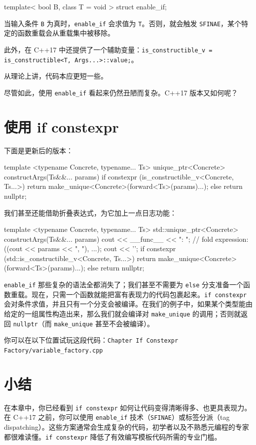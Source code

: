\begin{codebox}[cpp]
template< bool B, class T = void >
struct enable_if;
\end{codebox}

当输入条件 \texttt{B} 为真时，\texttt{enable\_if} 会求值为 \texttt{T}。否则，就会触发 \texttt{SFINAE}，某个特定的函数重载会从重载集中被移除。

此外，在 C++17 中还提供了一个辅助变量：\texttt{is\_constructible\_v = is\_constructible<T, Args...>::value;}。

从理论上讲，代码本应更短一些。

尽管如此，使用 \texttt{enable\_if} 看起来仍然丑陋而复杂。C++17 版本又如何呢？

\section{使用 if constexpr}

下面是更新后的版本：

\begin{codebox}[cpp]
template <typename Concrete, typename... Ts>
unique_ptr<Concrete> constructArgs(Ts&&... params)
{
if constexpr (is_constructible_v<Concrete, Ts...>)
return make_unique<Concrete>(forward<Ts>(params)...);
else
return nullptr;
}
\end{codebox}

我们甚至还能借助折叠表达式，为它加上一点日志功能：

\begin{codebox}[cpp]
template <typename Concrete, typename... Ts>
std::unique_ptr<Concrete> constructArgs(Ts&&... params)
{
cout << __func__ << ": ";
// fold expression:
((cout << params << ", "), ...);
cout << '\n';
if constexpr (std::is_constructible_v<Concrete, Ts...>)
return make_unique<Concrete>(forward<Ts>(params)...);
else
return nullptr;
}
\end{codebox}

\texttt{enable\_if} 那些复杂的语法全都消失了；我们甚至不需要为 \texttt{else} 分支准备一个函数重载。现在，只需一个函数就能把富有表现力的代码包裹起来。\texttt{if constexpr} 会对条件求值，并且只有一个分支会被编译。在我们的例子中，如果某个类型能由给定的一组属性构造出来，那么我们就会编译对 \texttt{make\_unique} 的调用；否则就返回 \texttt{nullptr}（而 \texttt{make\_unique} 甚至不会被编译）。

你可以在以下位置试玩这段代码：\texttt{Chapter If Constexpr Factory/variable\_factory.cpp}

\section{小结}

在本章中，你已经看到 \texttt{if constexpr} 如何让代码变得清晰得多、也更具表现力。在 C++17 之前，你可以使用 \texttt{enable\_if} 技术（\texttt{SFINAE}）或标签分派（tag dispatching）。这些方案通常会生成复杂的代码，初学者以及不熟悉元编程的专家都很难读懂。\texttt{if constexpr} 降低了有效编写模板代码所需的专业门槛。
